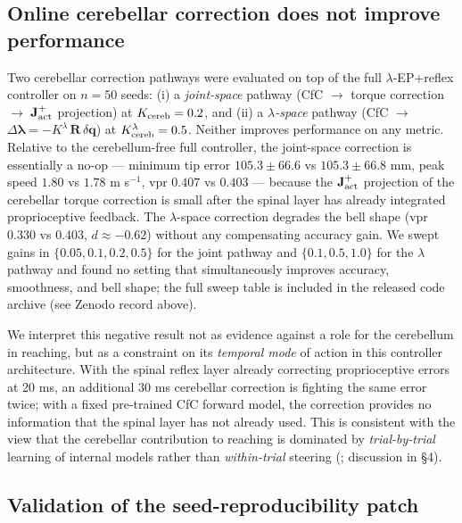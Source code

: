 \documentclass[sn-basic]{sn-jnl}
\begin{document}
\subsection{Online cerebellar correction does not improve
performance}

Two cerebellar correction pathways were evaluated on top of the full
$\lambda$-EP+reflex controller on \(n = 50\) seeds: (i) a \emph{joint-space}
pathway (CfC \(\to\) torque correction \(\to\)
\(\mathbf{J}_{\rm act}^{+}\) projection) at \(K_{\rm cereb} = 0.2\), and
(ii) a \emph{$\lambda$-space} pathway (CfC \(\to\)
\(\Delta\boldsymbol{\lambda} = -K^{\lambda}\,\mathbf{R}\,\delta\mathbf{q}\))
at \(K_{\rm cereb}^{\lambda} = 0.5\). Neither improves performance on
any metric. Relative to the cerebellum-free full controller, the
joint-space correction is essentially a no-op --- minimum tip error
\(105.3 \pm 66.6\) vs \(105.3 \pm 66.8\) mm, peak speed \(1.80\) vs
\(1.78\) m s\(^{-1}\), vpr \(0.407\) vs \(0.403\) --- because the
\(\mathbf{J}_{\rm act}^{+}\) projection of the cerebellar torque
correction is small after the spinal layer has already integrated
proprioceptive feedback. The $\lambda$-space correction degrades the bell shape
(vpr \(0.330\) vs \(0.403\), \(d \approx -0.62\)) without any
compensating accuracy gain. We swept gains in
\(\{0.05, 0.1, 0.2, 0.5\}\) for the joint pathway and
\(\{0.1, 0.5, 1.0\}\) for the $\lambda$ pathway and found no setting that
simultaneously improves accuracy, smoothness, and bell shape; the full
sweep table is included in the released code archive (see Zenodo record
above).

We interpret this negative result not as evidence against a role for the
cerebellum in reaching, but as a constraint on its \emph{temporal mode}
of action in this controller architecture. With the spinal reflex layer
already correcting proprioceptive errors at 20 ms, an additional 30 ms
cerebellar correction is fighting the same error twice; with a fixed
pre-trained CfC forward model, the correction provides no information
that the spinal layer has not already used. This is consistent with the
view that the cerebellar contribution to reaching is dominated by
\emph{trial-by-trial} learning of internal models rather than
\emph{within-trial} steering (\citealt{wolpert1998, ito2008}; discussion
in §4).

\subsection{Validation of the seed-reproducibility
patch}
\end{document}

